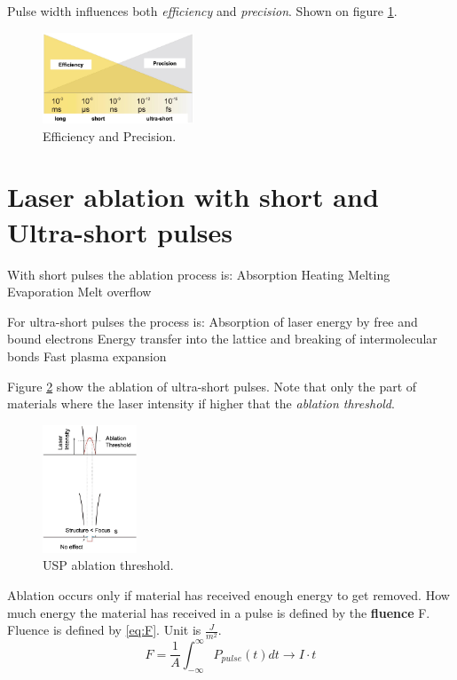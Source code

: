 Pulse width influences both \textit{efficiency} and \textit{precision}. Shown on figure \ref{fig:ldep}.
\begin{figure}[h!]
    \centering
    \includegraphics[width=0.4\textwidth]{slike/ldep.png}
    \caption{Efficiency and Precision. \sln}
    \label{fig:ldep}
\end{figure}

\section{Laser ablation with short and Ultra-short pulses}
With short pulses the ablation process is:\newline
Absorption \pd Heating \pd Melting \pd Evaporation \pd Melt overflow

For ultra-short pulses the process is:\newline
Absorption of laser energy by free and bound electrons \pd Energy transfer into the lattice and breaking of intermolecular bonds 
\pd Fast plasma expansion


Figure \ref{fig:uspablation} show the ablation of ultra-short pulses. Note that only the part of materials where
the laser intensity if higher that the \textit{ablation threshold}.

\begin{figure}[h!]
    \centering
    \includegraphics[width=0.25\textwidth]{slike/ablthr.png}
    \caption{USP ablation threshold. \sln}
    \label{fig:uspablation}
\end{figure}

Ablation occurs only if material has received enough energy to get removed. 
How much energy the material has received in a pulse is defined by the \textbf{fluence} F.
Fluence is defined by \ref{eq:F}. Unit is $\frac{J}{m^2}$.
\begin{equation}
    F = \frac{1}{A} \int_{-\infty}^{\infty} P_{pulse}(t) dt \rightarrow I \cdot t
    \label{eq:F}
\end{equation}

